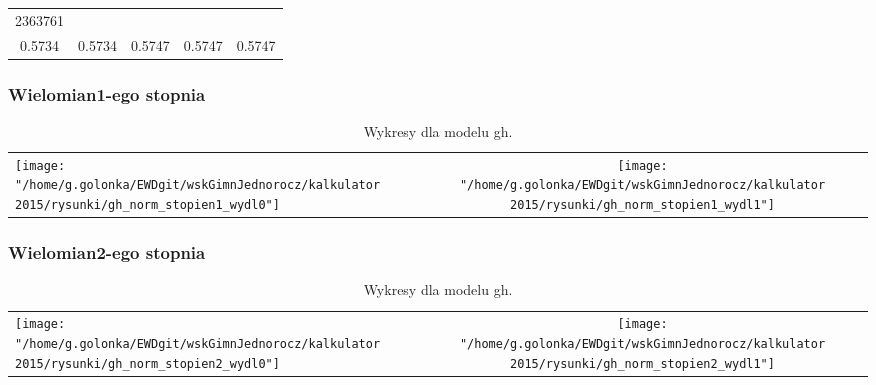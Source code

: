 \documentclass[]{article}
\begin{document}
\begin{longtable}[c]{@{}ccccc@{}}
\begin{minipage}[t]{0.14\columnwidth}
2363761
\strut\end{minipage}\tabularnewline
\begin{minipage}[t]{0.14\columnwidth}\centering\strut
0.5734
\strut\end{minipage} &
\begin{minipage}[t]{0.14\columnwidth}\centering\strut
0.5734
\strut\end{minipage} &
\begin{minipage}[t]{0.14\columnwidth}\centering\strut
0.5747
\strut\end{minipage} &
\begin{minipage}[t]{0.14\columnwidth}\centering\strut
0.5747
\strut\end{minipage} &
\begin{minipage}[t]{0.14\columnwidth}\centering\strut
0.5747
\strut\end{minipage}\tabularnewline
\bottomrule
\end{longtable}

\subsubsection{Wielomian1-ego stopnia}\label{StopienWielomianu}\begin{table}[h] 
\begin{tabularx}{1\textwidth}{@{\hspace{1.7 mm}}Xcc@{\hspace{1.7 mm}}} 
\texttt{[image: "/home/g.golonka/EWDgit/wskGimnJednorocz/kalkulator 2015/rysunki/gh\_norm\_stopien1\_wydl0"]} 
& 
\texttt{[image: "/home/g.golonka/EWDgit/wskGimnJednorocz/kalkulator 2015/rysunki/gh\_norm\_stopien1\_wydl1"]} \\ 
\end{tabularx} 
\caption{Wykresy dla modelu gh.} 
\end{table}

\pagebreak

\subsubsection{Wielomian2-ego stopnia}\label{StopienWielomianu}\begin{table}[h] 
\begin{tabularx}{1\textwidth}{@{\hspace{1.7 mm}}Xcc@{\hspace{1.7 mm}}} 
\texttt{[image: "/home/g.golonka/EWDgit/wskGimnJednorocz/kalkulator 2015/rysunki/gh\_norm\_stopien2\_wydl0"]} 
& 
\texttt{[image: "/home/g.golonka/EWDgit/wskGimnJednorocz/kalkulator 2015/rysunki/gh\_norm\_stopien2\_wydl1"]} \\ 
\end{tabularx} 
\caption{Wykresy dla modelu gh.} 
\end{table}
\end{document}
